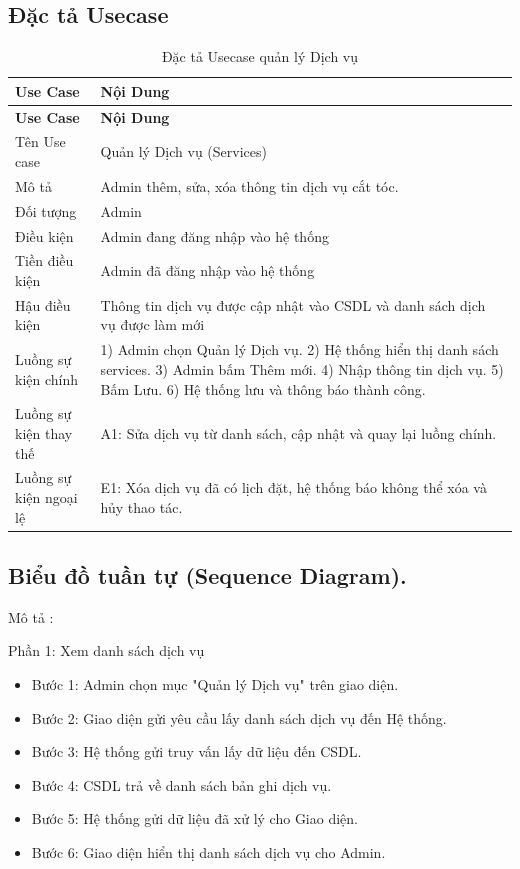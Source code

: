 \documentclass[../BTL.tex]{subfiles}
\begin{document}
\subsection{Đặc tả Usecase}
\begin{longtable}{|p{}|p{}|}
\caption{Đặc tả Usecase quản lý Dịch vụ}\label{tab:usecase-quan-ly-dich-vu}\\
\hline
\textbf{Use Case} & \textbf{Nội Dung} \\
\hline
\endfirsthead
\hline
\textbf{Use Case} & \textbf{Nội Dung} \\
\hline
\endhead
Tên Use case & Quản lý Dịch vụ (Services) \\
\hline
Mô tả & Admin thêm, sửa, xóa thông tin dịch vụ cắt tóc. \\
\hline
Đối tượng & Admin \\
\hline
Điều kiện & Admin đang đăng nhập vào hệ thống \\
\hline
Tiền điều kiện & Admin đã đăng nhập vào hệ thống \\
\hline
Hậu điều kiện & Thông tin dịch vụ được cập nhật vào CSDL và danh sách dịch vụ được làm mới \\
\hline
Luồng sự kiện chính & 1) Admin chọn Quản lý Dịch vụ. 2) Hệ thống hiển thị danh sách services. 3) Admin bấm Thêm mới. 4) Nhập thông tin dịch vụ. 5) Bấm Lưu. 6) Hệ thống lưu và thông báo thành công. \\
\hline
Luồng sự kiện thay thế & A1: Sửa dịch vụ từ danh sách, cập nhật và quay lại luồng chính. \\
\hline
Luồng sự kiện ngoại lệ & E1: Xóa dịch vụ đã có lịch đặt, hệ thống báo không thể xóa và hủy thao tác. \\
\hline
\end{longtable}

\subsection{Biểu đồ tuần tự (Sequence Diagram).}

Mô tả :

Phần 1: Xem danh sách dịch vụ

\begin{itemize}
\item
  Bước 1: Admin chọn mục "Quản lý Dịch vụ" trên giao diện.
\item
  Bước 2: Giao diện gửi yêu cầu lấy danh sách dịch vụ đến Hệ thống.
\item
  Bước 3: Hệ thống gửi truy vấn lấy dữ liệu đến CSDL.
\item
  Bước 4: CSDL trả về danh sách bản ghi dịch vụ.
\item
  Bước 5: Hệ thống gửi dữ liệu đã xử lý cho Giao diện.
\item
  Bước 6: Giao diện hiển thị danh sách dịch vụ cho Admin.
\end{itemize}
\end{document}
